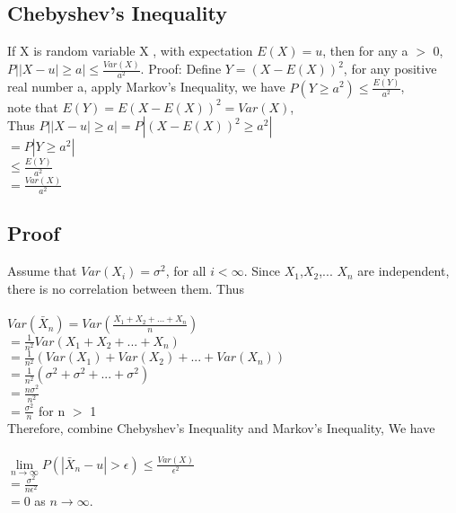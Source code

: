 \documentclass{article}
\begin{document}
\subsection{Chebyshev's Inequality}
\hspace{4mm} If X is random variable X , with expectation $E(X)=u$, then for any a $>$ 0, $P||X-u| \geq a| \leq \frac{Var(X)}{a^2}$.
Proof: Define $Y=(X-E(X))^2$, for any positive real number a, apply Markov's Inequality, we have $P(Y \geq a^2)\leq \frac{E(Y)}{a^2}$,\\
note that $E(Y)=E(X-E(X))^2=Var(X)$,\\
Thus $P||X-u| \geq a| = P|(X-E(X))^2 \geq a^2|$\\
\indent \indent \indent \indent \indent $=P|Y\geq a^2|$ \\
\indent \indent \indent \indent \indent $\leq \frac{E(Y)}{a^2}$\\
\indent \indent \indent \indent \indent $=\frac{Var(X)}{a^2}$

\subsection{Proof}
\hspace{4mm} Assume that $Var(X_i)=\sigma^2$, for all $i<\infty$. Since 
$X_1 $,$X_2$,... $X_n$ are independent, there is no correlation between them. Thus\\ \\
$Var(\bar{X}_n)=Var(\frac{X_1+X_2+...+X_n}{n})$\\
\indent \indent \indent $=\frac{1}{n^2}Var(X_1+X_2+...+X_n)$\\
\indent \indent \indent $=\frac{1}{n^2}(Var(X_1)+Var(X_2)+...+Var(X_n))$\\
\indent \indent \indent $=\frac{1}{n^2}(\sigma^2+\sigma^2+...+\sigma^2)$\\
\indent \indent \indent $=\frac{n\sigma^2}{n^2}$\\
\indent \indent \indent $=\frac{\sigma^2}{n}$ for n $>$ 1\\
Therefore, combine Chebyshev's Inequality and Markov's Inequality, 
We have \\ \\
$\lim\limits_{n \to \infty}P( |\bar{X}_n-u|> \epsilon) \leq \frac{Var(X)}{\epsilon ^2}$\\
\indent \indent \indent \indent \indent \indent 
$=\frac{\sigma ^2}{n \epsilon ^2}$\\
\indent \indent \indent \indent \indent \indent
$=0$ as $n \to \infty$.
\end{document}
